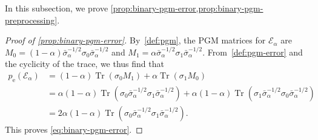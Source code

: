\documentclass[11pt]{article}
\theoremstyle{remark}
\newcommand{\cE}{\mathcal{E}}
\newcommand{\Tr}{\operatorname{Tr}}
\begin{document}
In this subsection, we prove \cref{prop:binary-pgm-error,prop:binary-pgm-preprocessing}.

\begin{proof}[Proof of \cref{prop:binary-pgm-error}]
By~\cref{def:pgm}, the PGM matrices for $\cE_\alpha$ are $M_0 = (1-\alpha)\bar{\sigma}_\alpha^{-1/2}\sigma_0\bar{\sigma}_\alpha^{-1/2}$ and $M_1 = \alpha\bar{\sigma}_\alpha^{-1/2}\sigma_1\bar{\sigma}_\alpha^{-1/2}$.
From~\cref{def:pgm-error} and the cyclicity of the trace, we thus find that
\begin{align*}
p_{\mathrm{e}}(\cE_\alpha)
&= (1-\alpha)\Tr(\sigma_0M_1)+\alpha\Tr(\sigma_1M_0) \\
&= \alpha(1-\alpha)\Tr\left(\sigma_0\bar{\sigma}_\alpha^{-1/2}\sigma_1\bar{\sigma}_\alpha^{-1/2}\right)
+\alpha(1-\alpha)\Tr\left(\sigma_1\bar{\sigma}_\alpha^{-1/2}\sigma_0\bar{\sigma}_\alpha^{-1/2}\right) \\
&= 2\alpha(1-\alpha)\Tr\left(\sigma_0\bar{\sigma}_\alpha^{-1/2}\sigma_1\bar{\sigma}_\alpha^{-1/2}\right).
\end{align*}
This proves \eqref{eq:binary-pgm-error}.


\end{proof}
\end{document}
